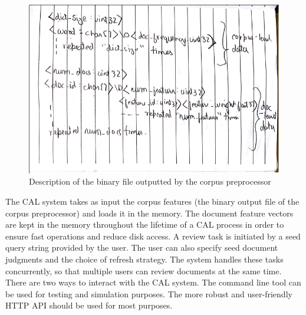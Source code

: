 \begin{figure}[h]
\includegraphics[width=\textwidth]{tmp_pictures/binary.png}
\caption{Description of the binary file outputted by the corpus preprocessor}
\label{fig:binary_format}
\end{figure}
The CAL system takes as input the corpus features (the binary output file
of the corpus preprocessor) and loads it in the memory. The document feature
vectors are kept in the memory throughout the lifetime of a CAL process in order
to ensure fast operations and reduce disk access. A review task is initiated by
a seed query string provided by the user. The user can also specify
seed document judgments and the choice of refresh strategy. The system handles
these tasks concurrently, so that multiple users can review documents
at the same time.
There are two ways to interact with the CAL system. The command line tool can be
used for testing and simulation purposes. The more robust and user-friendly HTTP
API should be used for most purposes.
